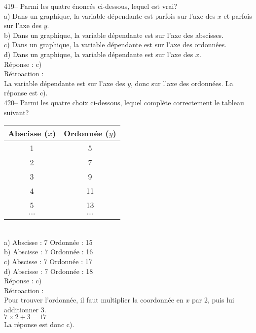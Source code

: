 ﻿\documentclass[letterpaper, 12pt]{article}
\begin{document}
419-- Parmi les quatre \'enonc\'es ci-dessous, lequel est vrai?\\
a) Dans un graphique, la variable d\'ependante est parfois sur l'axe des $x$
et parfois sur l'axe des $y$.  \\
b) Dans un graphique, la variable d\'ependante est sur l'axe des
abscisses.\\
c) Dans un graphique, la variable d\'ependante est sur l'axe des
ordonn\'ees.\\
d) Dans un graphique, la variable d\'ependante est sur l'axe des $x$.\\

R\'eponse : c)\\

R\'etroaction :\\
La variable d\'ependante est sur l'axe des $y$, donc sur l'axe des
ordonn\'ees.  La r\'eponse est c).\\


420-- Parmi les quatre choix ci-dessous, lequel compl\`ete correctement le
tableau suivant?\\
\begin{tabular}{|c|c|} \hline
{\bf Abscisse ($x$)} & {\bf Ordonn\'ee ($y$)}  \\ \hline \hline

1 & 5 \\ \hline
2 & 7 \\ \hline
3 & 9 \\ \hline
4 & 11 \\ \hline
5 & 13 \\ \hline
$\ldots$ & $\ldots$ \\ \hline
\multicolumn{2}{c}{}\\
\end{tabular}\\
a) Abscisse : 7 \qquad Ordonn\'ee : 15\\
b) Abscisse : 7 \qquad Ordonn\'ee : 16\\
c) Abscisse : 7 \qquad Ordonn\'ee : 17\\
d) Abscisse : 7 \qquad Ordonn\'ee : 18\\

R\'eponse : c)\\

R\'etroaction :\\
Pour trouver l'ordonn\'ee, il faut multiplier la coordonn\'ee en $x$ par 2,
puis lui additionner 3.  \\
$7\times2+3=17$\\
La r\'eponse est donc c).\\
\end{document}
